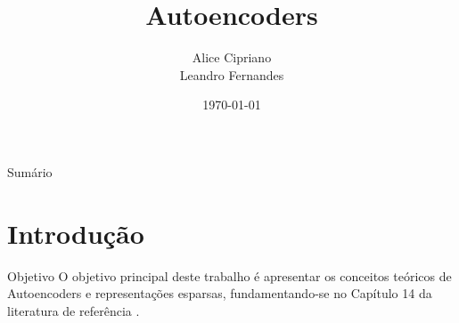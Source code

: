\documentclass[aspectratio=169,xcolor=dvipsnames]{beamer}
\title{Autoencoders}
\author{Alice Cipriano \\ Leandro Fernandes}
\institute{CPE727 - Aprendizado Profundo}
\date{\today}
\begin{document}
\begin{frame}[plain]
    \titlepage
\end{frame}

\begin{frame}{Sumário}
    \tableofcontents
\end{frame}

\section{Introdução}

\begin{frame}{Objetivo}
    O objetivo principal deste trabalho é apresentar os conceitos teóricos de Autoencoders e representações esparsas, fundamentando-se no Capítulo 14 da literatura de referência \cite{Goodfellow2016}.
\end{frame}
\end{document}
